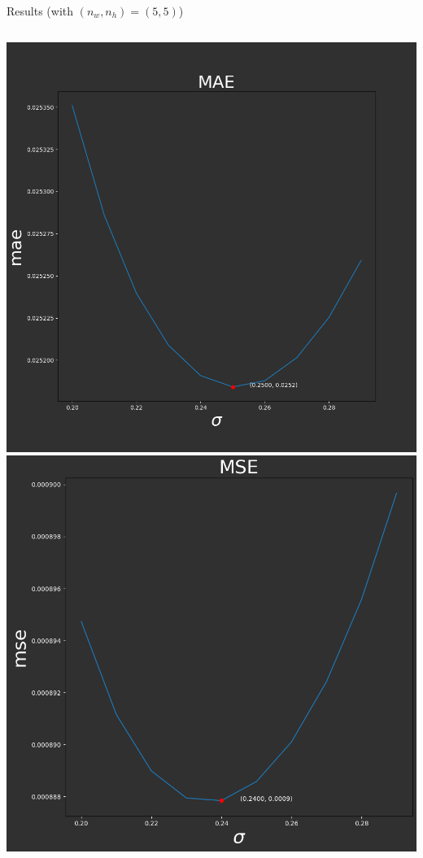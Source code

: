 \begin{frame}{Results (with $(n_w, n_h) = (5, 5)$)}
\centering
\begin{columns}
\centering
\includegraphics[scale=0.25]{images/results/nlm/plot_mae.png}
\centering
\includegraphics[scale=0.25]{images/results/nlm/plot_mse.png}
\end{columns}
\end{frame}

